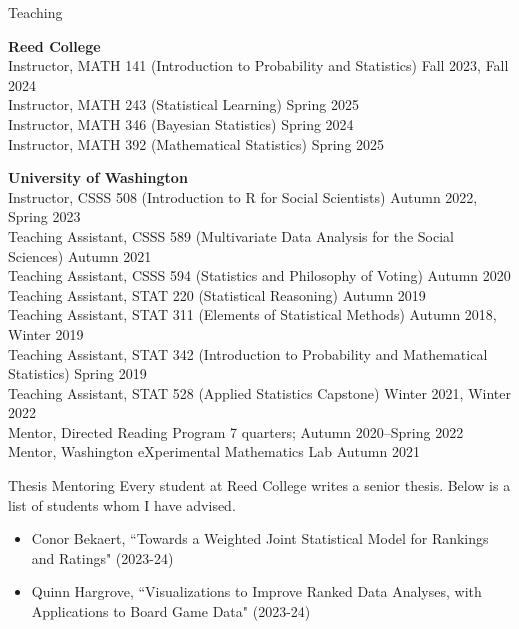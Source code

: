 \documentclass{resume} %
\begin{document}
\newpage
\begin{rSection}{Teaching}

\textbf{Reed College}
\\ Instructor, MATH 141 (Introduction to Probability and Statistics) \hfill {Fall 2023, Fall 2024}
\\ Instructor, MATH 243 (Statistical Learning) \hfill {Spring 2025}
\\ Instructor, MATH 346 (Bayesian Statistics) \hfill {Spring 2024}
\\ Instructor, MATH 392 (Mathematical Statistics) \hfill {Spring 2025}

\textbf{University of Washington}
\\ Instructor, CSSS 508 (Introduction to R for Social Scientists) \hfill {Autumn 2022, Spring 2023}
\\ Teaching Assistant, CSSS 589 (Multivariate Data Analysis for the Social Sciences) \hfill Autumn 2021
\\ Teaching Assistant, CSSS 594 (Statistics and Philosophy of Voting) \hfill Autumn 2020
\\ Teaching Assistant, STAT 220 (Statistical Reasoning) \hfill {Autumn 2019}
\\ Teaching Assistant, STAT 311 (Elements of Statistical Methods) \hfill {Autumn 2018, Winter 2019}
\\ Teaching Assistant, STAT 342 (Introduction to Probability and Mathematical Statistics) \hfill {Spring 2019}
\\ Teaching Assistant, STAT 528 (Applied Statistics Capstone) \hfill {Winter 2021, Winter 2022}
\\ Mentor, Directed Reading Program \hfill{7 quarters; Autumn 2020--Spring 2022}
\\ Mentor, Washington eXperimental Mathematics Lab \hfill {Autumn 2021}

\end{rSection}

\begin{rSection}{Thesis Mentoring}
Every student at Reed College writes a senior thesis. Below is a list of students whom I have advised.
\begin{itemize}
\item Conor Bekaert, ``Towards a Weighted Joint Statistical Model for Rankings and Ratings" (2023-24)
\item Quinn Hargrove, ``Visualizations to Improve Ranked Data Analyses, with Applications to Board Game Data" (2023-24)
\end{itemize}

\end{rSection}
\end{document}
